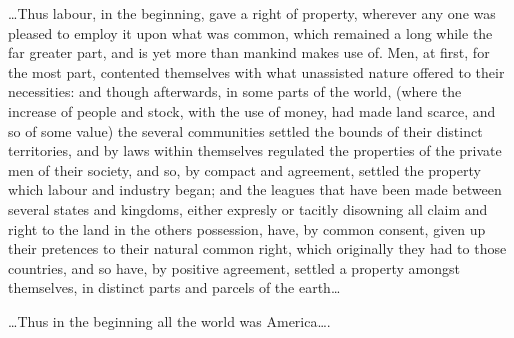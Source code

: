 \ldots Thus labour, in the beginning, gave a right of property, wherever any one
was pleased to employ it upon what was common, which remained a long while the
far greater part, and is yet more than mankind makes use of. Men, at first, for
the most part, contented themselves with what unassisted nature offered to their
necessities: and though afterwards, in some parts of the world, (where the
increase of people and stock, with the use of money, had made land scarce, and
so of some value) the several communities settled the bounds of their distinct
territories, and by laws within themselves regulated the properties of the
private men of their society, and so, by compact and agreement, settled the
property which labour and industry began; and the leagues that have been made
between several states and kingdoms, either expresly or tacitly disowning all
claim and right to the land in the others possession, have, by common consent,
given up their pretences to their natural common right, which originally they
had to those countries, and so have, by positive agreement, settled a property
amongst themselves, in distinct parts and parcels of the earth\ldots

\ldots Thus in the beginning all the world was America\ldots .

